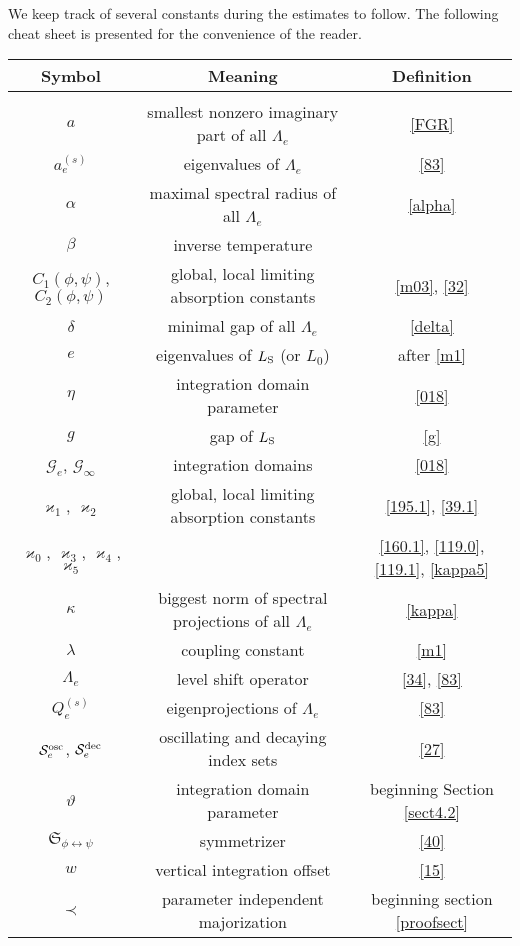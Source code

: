 \documentclass[letterpaper,onecolumn,11pt,accepted=2021-12-09]{quantumarticle}
\numberwithin{equation}{section}
\newcommand{\s}{{\rm S}}
\begin{document}
We keep track of several constants during the estimates to follow. The following cheat sheet is presented for the convenience of the reader.
\begin{table}[ht]
	\centering %
	\begin{tabular}{c c c } %
		Symbol & Meaning & Definition  \\ [.5ex] %
	\hline \\ [-2ex]%
$a$& smallest nonzero imaginary part of all $\Lambda_e$ & \eqref{FGR}  \\ 
$a_e^{(s)}$ & eigenvalues of $\Lambda_e$ &  \eqref{83}\\ 
$\alpha$  & maximal spectral radius of all $\Lambda_e$ & \eqref{alpha}  \\
$\beta$ & inverse temperature & \\
$C_1(\phi,\psi)$, $C_2(\phi,\psi)$ & global, local limiting absorption constants & \eqref{m03}, \eqref{32}\\
$\delta$ & minimal gap of all $\Lambda_e$ & \eqref{delta}  \\
$e$ & eigenvalues of $L_\s$ (or $L_0$) & after \eqref{m1}  \\ 
$\eta$ & integration domain parameter &\eqref{018} \\
$g$ & gap of $L_\s$ & \eqref{g}  \\
${\mathcal G}_e$, ${\mathcal G}_\infty$ & integration domains & \eqref{018}\\
$\varkappa_1$, $\varkappa_2$ & global, local limiting absorption constants & \eqref{195.1}, \eqref{39.1}\\
$\varkappa_0$, $\varkappa_3$, $\varkappa_4$, $\varkappa_5$ & & \eqref{160.1}, \eqref{119.0}, \eqref{119.1}, \eqref{kappa5}\\
$\kappa$ & biggest norm of spectral projections of all  $\Lambda_e$& \eqref{kappa}\\
$\lambda$ & coupling constant & \eqref{m1} \\
$\Lambda_e$ & level shift operator & \eqref{34}, \eqref{83}\\
$Q_e^{(s)}$ & eigenprojections of $\Lambda_e$ & \eqref{83}\\
${\mathcal S}_e^{\rm osc}$, ${\mathcal S}_e^{\rm dec}$ & oscillating and decaying index sets & \eqref{27}\\
$\vartheta$ & integration domain parameter & beginning Section \ref{sect4.2}\\
${\mathfrak S}_{\phi\leftrightarrow\psi}$ &  symmetrizer & \eqref{40} \\
$w$ & vertical integration offset & \eqref{15} \\
$\prec$ & parameter independent majorization & beginning section \ref{proofsect}\\
[1ex] %
		\hline %
	\end{tabular}
\end{table}
\end{document}
